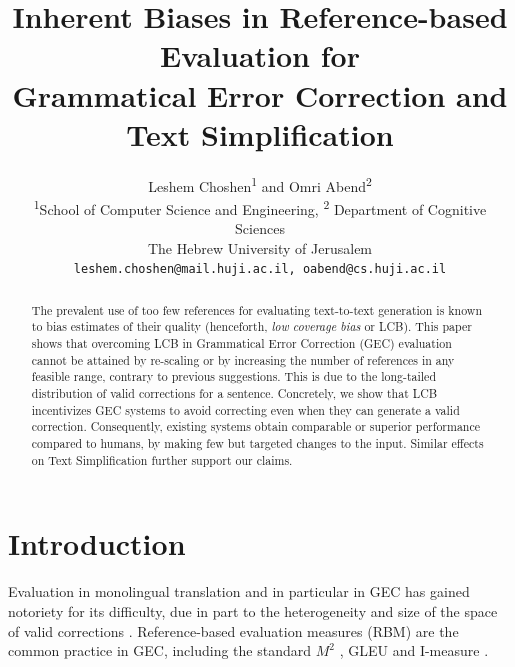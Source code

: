\documentclass[11pt, a4paper]{article}
\newcommand{\lc}[1]{\footnote{\color{blue}LC: #1}}
\begin{document}
\title{Inherent Biases in Reference-based Evaluation for \\ Grammatical Error Correction and Text Simplification}
\author{
  Leshem Choshen\textsuperscript{1} and Omri Abend\textsuperscript{2} \\
  \textsuperscript{1}School of Computer Science and Engineering,
  \textsuperscript{2} Department of Cognitive Sciences \\
  The Hebrew University of Jerusalem \\
  \texttt{leshem.choshen@mail.huji.ac.il, oabend@cs.huji.ac.il}\\
}
\maketitle

	\begin{abstract}
		The prevalent use of too few references for evaluating text-to-text
		generation is known to bias estimates of their quality (henceforth, {\it low
		  coverage bias} or LCB). This paper shows that overcoming LCB in
		Grammatical Error Correction (GEC) evaluation cannot be attained by
		re-scaling or by increasing the number of references in any feasible
		range, contrary to previous suggestions. This is due to the long-tailed distribution of valid corrections for a sentence.
		Concretely, we show that LCB incentivizes GEC systems to avoid
    correcting even when they can generate a valid correction. 
    Consequently, existing systems obtain comparable or
		superior performance compared to humans, by making few but targeted 
		changes to the input.
		Similar effects on Text Simplification further support our claims.
	\end{abstract}

	\section{Introduction}
	
	Evaluation in monolingual translation \cite{xu2015problems,inderjeet2009summarization} and
	in particular in GEC
	\cite{tetreault2008native,madnani2011they,felice2015towards,bryant2015far,napoles2015ground}
	has gained notoriety for its difficulty, due in part to the heterogeneity and size of the space of 
	valid corrections \cite{chodorow2012problems,dreyer2012hyter}.
	Reference-based evaluation measures (RBM) are the common practice in GEC, including the standard
	$M^2$ \cite{dahlmeier2012better}, GLEU \cite{napoles2015ground} and I-measure \cite{felice2015towards}.
	
\end{document}
